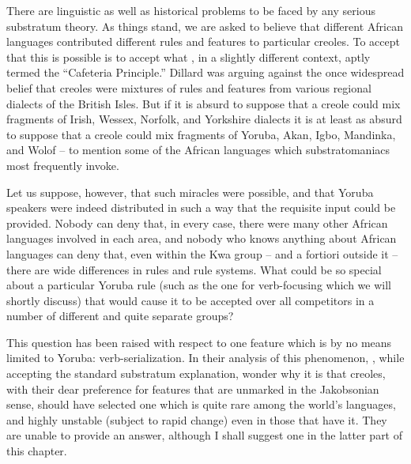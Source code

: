 There are linguistic as well as historical problems to be faced by any serious substratum theory. As things stand, we are asked to believe that different African languages contributed different rules and features to particular creoles. To accept that this is possible is to accept what \citet{Dillard1970}, in a slightly different context, aptly termed the ``Cafe\-teria Principle.'' Dillard was arguing against the once widespread belief that creoles were mixtures of rules and features from various regional dialects of the British Isles. But if it is absurd to suppose that a creole could mix fragments of Irish, Wessex, Norfolk, and Yorkshire dialects it is at least as absurd to suppose that a creole could mix fragments of Yoruba, Akan, Igbo, Mandinka, and Wolof -- to mention some of the African languages which substratomaniacs most frequently invoke.

Let us suppose, however, that such miracles were possible, and that Yoruba speakers were indeed distributed in such a way that the
requisite input could be provided. Nobody can deny that, in every case, there were many other African languages involved in each area, and nobody who knows anything about African languages can deny that, even within the Kwa group -- and a fortiori outside it -- there are wide differences in rules and rule systems. What could be so special about a particular Yoruba rule (such as the one for verb-focusing which we will shortly discuss) that would cause it to be accepted over all compe\-titors in a number of different and quite separate groups?

This question has been raised with respect to one feature which is by no means limited to Yoruba: verb-serialization. In their analysis of this phenomenon, \citet{JansenEtAl1978}, while accepting the standard substratum explanation, wonder why it is that creoles, with their dear preference for features that are unmarked in the Jakobsonian sense, should have selected one which is quite rare among the world's languages, and highly unstable (subject to rapid change) even in those that have it. They are unable to provide an answer, although I shall suggest one in the latter part of this chapter.

